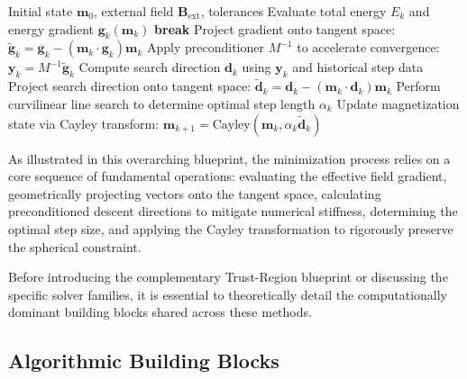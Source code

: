 \documentclass[10pt, a4paper, twocolumn]{article}
\begin{document}
\begin{algorithm}[H]
\caption{Generic Preconditioned Iterative Minimization in Micromagnetics}
\label{alg:generic_minimizer}
\begin{algorithmic}[1]
\REQUIRE Initial state $\mathbf{m}_0$, external field $\mathbf{B}_{\mathrm{ext}}$, tolerances
    \STATE Evaluate total energy $E_k$ and energy gradient $\mathbf{g}_k(\mathbf{m}_k)$ 
        \STATE \textbf{break}
    \ENDIF
    \STATE Project gradient onto tangent space: $\tilde{\mathbf{g}}_k = \mathbf{g}_k - (\mathbf{m}_k \cdot \mathbf{g}_k)\mathbf{m}_k$
    \STATE Apply preconditioner $M^{-1}$ to accelerate convergence: $\mathbf{y}_k = M^{-1} \tilde{\mathbf{g}}_k$
    \STATE Compute search direction $\mathbf{d}_k$ using $\mathbf{y}_k$ and historical step data
    \STATE Project search direction onto tangent space: $\tilde{\mathbf{d}}_k = \mathbf{d}_k - (\mathbf{m}_k \cdot \mathbf{d}_k)\mathbf{m}_k$
    \STATE Perform curvilinear line search to determine optimal step length $\alpha_k$
    \STATE Update magnetization state via Cayley transform: $\mathbf{m}_{k+1} = \mathrm{Cayley}(\mathbf{m}_k, \alpha_k \tilde{\mathbf{d}}_k)$
\ENDFOR
\end{algorithmic}
\end{algorithm}

As illustrated in this overarching blueprint, the minimization process relies on a core sequence of fundamental operations: evaluating the effective field gradient, geometrically projecting vectors onto the tangent space, calculating preconditioned descent directions to mitigate numerical stiffness, determining the optimal step size, and applying the Cayley transformation to rigorously preserve the spherical constraint. 

Before introducing the complementary Trust-Region blueprint or discussing the specific solver families, it is essential to theoretically detail the computationally dominant building blocks shared across these methods.

\subsection{Algorithmic Building Blocks}
\end{document}
